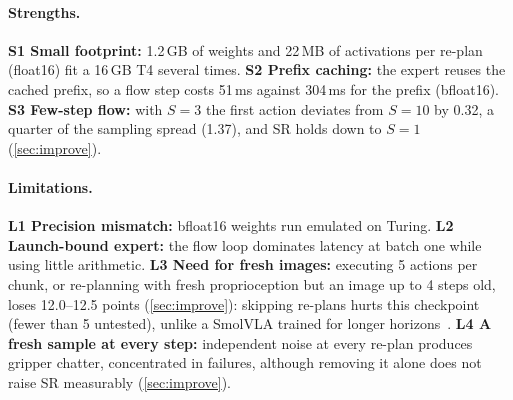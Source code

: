 \paragraph{Strengths.}
\textbf{S1 Small footprint:} 1.2\,GB of weights and 22\,MB of activations per re-plan (float16) fit a 16\,GB T4 several times.
\textbf{S2 Prefix caching:} the expert reuses the cached prefix, so a flow step costs 51\,ms against 304\,ms for the prefix (bfloat16).
\textbf{S3 Few-step flow:} with $S{=}3$ the first action deviates from $S{=}10$ by 0.32, a quarter of the sampling spread (1.37), and SR holds down to $S{=}1$ (\cref{sec:improve}).

\paragraph{Limitations.}
\textbf{L1 Precision mismatch:} bfloat16 weights run emulated on Turing.
\textbf{L2 Launch-bound expert:} the flow loop dominates latency at batch one while using little arithmetic.
\textbf{L3 Need for fresh images:} executing 5 actions per chunk, or re-planning with fresh proprioception but an image up to 4 steps old, loses 12.0--12.5 points (\cref{sec:improve}): skipping re-plans hurts this checkpoint (fewer than 5 untested), unlike a SmolVLA trained for longer horizons~\cite{sendai2025leave}.
\textbf{L4 A fresh sample at every step:} independent noise at every re-plan produces gripper chatter, concentrated in failures, although removing it alone does not raise SR measurably (\cref{sec:improve}).
